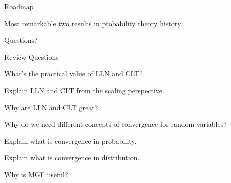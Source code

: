 \begin{frame}{Roadmap}

\plitemsep 0.1in

\bci 
\item Most remarkable two results in probability theory history

\bigskip

\item {}
\item {}
\item {}

\item {}

\item {}
\eci 

\end{frame}


\begin{frame}{}
\vspace{2cm}
\LARGE Questions?

\end{frame}

\begin{frame}{Review Questions}

\bce[1)]
\item What's the practical value of LLN and CLT?

\item Explain LLN and CLT from the scaling perspective.

\item Why are LLN and CLT great?

\item Why do we need different concepts of convergence for random variables?

\item Explain what is convergence in probability.

\item Explain what is convergence in distribution. 

\item Why is MGF useful?

\ece

\end{frame}



